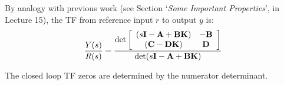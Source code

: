 By analogy with previous work (see Section `\emph{Some Important Properties}', in Lecture 15), the TF from reference input $r$  to output $y$  is:
\[
\frac{{Y(s)}}{{R(s)}} = \frac{{\det \left[ {\begin{array}{*{20}c}
   {(s{\bf{I}} - {\bf{A}} + {\bf{BK}})} & { - {\bf{B}}}  \\
   {({\bf{C}} - {\bf{DK}})} & {\bf{D}}  \\
\end{array}} \right]}}{{\det (s{\bf{I}} - {\bf{A}} + {\bf{BK}})}}
\]

The closed loop TF zeros are determined by the numerator determinant.


\endinput

